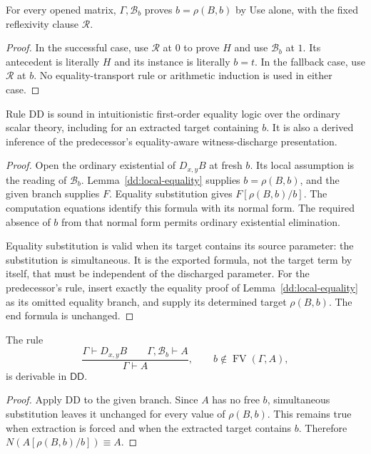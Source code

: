 \begin{lemma}
\label{dd:local-equality}
For every opened matrix, $\Gamma,\mathcal B_b$ proves
$b=\rho(B,b)$ by Use alone, with the fixed reflexivity clause $\mathcal R$.
\end{lemma}
\begin{proof}
In the successful case, use $\mathcal R$ at $0$ to prove $H$ and use
$\mathcal B_b$ at $1$.  Its antecedent is literally $H$ and its instance
is literally $b=t$.  In the fallback case, use $\mathcal R$ at $b$.
No equality-transport rule or arithmetic induction is used in either case.
\end{proof}

\begin{theorem}
\label{dd:sound}
Rule DD is sound in intuitionistic first-order equality logic over the
ordinary scalar theory, including for an extracted target containing $b$.
It is also a derived inference of the predecessor's equality-aware
witness-discharge presentation.
\end{theorem}
\begin{proof}
Open the ordinary existential of $D_{x,y}B$ at fresh $b$.  Its local
assumption is the reading of $\mathcal B_b$.  Lemma~\ref{dd:local-equality}
supplies $b=\rho(B,b)$, and the given branch supplies $F$.  Equality
substitution gives $F[\rho(B,b)/b]$.  The computation equations identify
this formula with its normal form.  The required absence of $b$ from that
normal form permits ordinary existential elimination.

Equality substitution is valid when its target contains its source
parameter: the substitution is simultaneous.  It is the exported formula,
not the target term by itself, that must be independent of the discharged
parameter.  For the predecessor's rule, insert exactly the equality proof
of Lemma~\ref{dd:local-equality} as its omitted equality branch, and supply
its determined target $\rho(B,b)$.  The end formula is unchanged.
\end{proof}

\begin{lemma}
\label{dd:ordinary-open}
The rule
\[
 \frac{\Gamma\vdash D_{x,y}B\qquad
       \Gamma,\mathcal B_b\vdash A}
      {\Gamma\vdash A},
 \qquad b\notin\operatorname{FV}(\Gamma,A),
\]
is derivable in $\mathsf{DD}$.
\end{lemma}
\begin{proof}
Apply DD to the given branch.  Since $A$ has no free $b$, simultaneous
substitution leaves it unchanged for every value of $\rho(B,b)$.
This remains true when extraction is forced and when the extracted target
contains $b$.  Therefore $N(A[\rho(B,b)/b])\equiv A$.
\end{proof}


